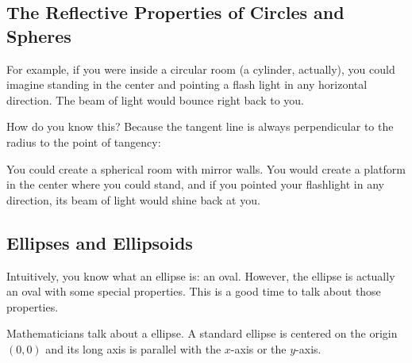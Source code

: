 \subsection{The Reflective Properties of Circles and Spheres}

For example, if you were inside a circular room (a cylinder,
actually), you could imagine standing in the center and pointing a
flash light in any horizontal direction. The beam of light would
bounce right back to you.


How do you know this?  Because the tangent line is always perpendicular to the radius to the point of tangency:


You could create a spherical room with mirror walls. You would
create a platform in the center where you could stand, and if you
pointed your flashlight in any direction, its beam of light would
shine back at you.

\subsection{Ellipses and Ellipsoids}

Intuitively, you know what an ellipse is: an oval. However, the
ellipse is actually an oval with some special properties. This is a
good time to talk about those properties.

Mathematicians talk about a  ellipse. A standard ellipse is
centered on the origin $(0,0)$ and its long axis is parallel with the
$x$-axis or the $y$-axis.

